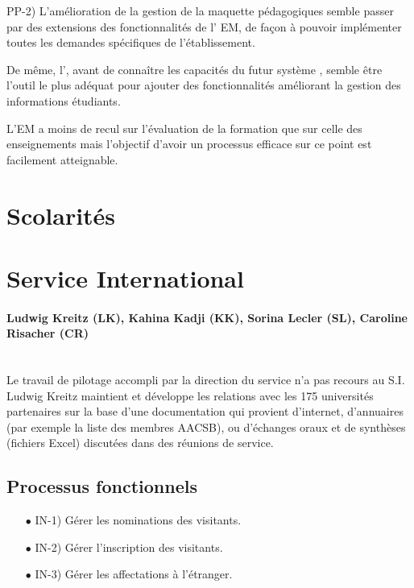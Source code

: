 \documentclass{book}
\begin{document}
PP-2) L'amélioration de la gestion de la maquette pédagogiques semble passer par
des extensions des fonctionnalités de l' EM, de façon à pouvoir
implémenter toutes les demandes spécifiques de l'établissement.

De même, l', avant de connaître les capacités du futur 
système , semble être l'outil le plus adéquat pour ajouter des 
fonctionnalités améliorant la gestion des informations étudiants.

L'EM a moins de recul sur l'évaluation de la formation que sur celle des enseignements
mais l'objectif d'avoir un processus efficace sur ce point est facilement atteignable.


 
\section{Scolarités}


\section{Service International}

\paragraph{Ludwig Kreitz (LK), Kahina Kadji (KK), Sorina Lecler (SL), Caroline Risacher (CR)}
~\\

Le travail de pilotage accompli par la direction du service n'a pas recours
au S.I. Ludwig Kreitz maintient et développe les relations avec les 175
universités partenaires sur la base d'une documentation qui provient d'internet, 
d'annuaires (par exemple la liste des membres AACSB), ou d'échanges oraux et
de synthèses (fichiers Excel) discutées dans des réunions de service.


\subsection{Processus fonctionnels}

\begin{itemize}
\item[$\bullet$] IN-1) Gérer les nominations des visitants.
\item[$\bullet$] IN-2) Gérer l'inscription des visitants.
\item[$\bullet$] IN-3) Gérer les affectations à l'étranger.
\end{itemize}
\end{document}
